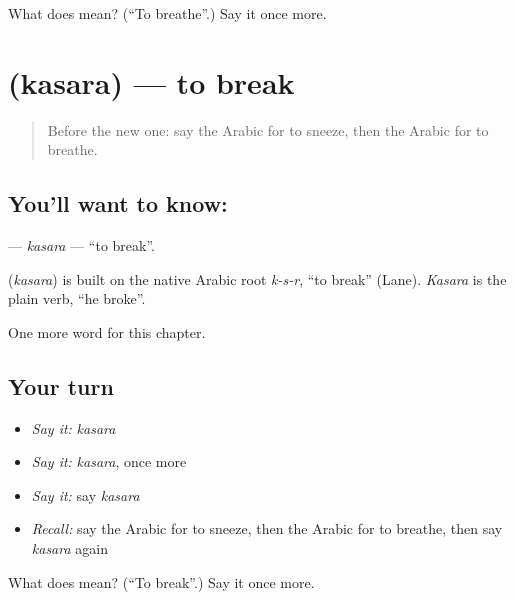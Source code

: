 \begin{tcolorbox}[breakable,colback=teal!4,colframe=teal!35!black,title={Before you move on}]
What does  mean? (\textquotedblleft{}To breathe\textquotedblright{}.) Say it once more.
\end{tcolorbox}
\section[\texorpdfstring{\ar{كسر} (kasara)}{كسر (kasara)}]{ (kasara) — to break}

\label{lesson:AR-C161-kasara}



\begin{quote}
Before the new one: say the Arabic for to sneeze, then the Arabic for to breathe.
\end{quote}

\subsection*{You'll want to know: }
\textbf{} — \emph{kasara} — \textquotedblleft{}to break\textquotedblright{}.

\begin{cousinweb}
\textbf{} (\emph{kasara}) is built on the native Arabic root \emph{k-s-r}, \textquotedblleft{}to break\textquotedblright{} (Lane). \emph{Kasara} is the plain verb, \textquotedblleft{}he broke\textquotedblright{}.
\end{cousinweb}

\begin{grammarlens}[title={What you've built}]
One more word for this chapter.
\end{grammarlens}

\subsection*{Your turn}
\begin{itemize}
\raggedright
  \item \emph{Say it:} \emph{kasara}
  \item \emph{Say it:} \emph{kasara}, once more
  \item \emph{Say it:} say \emph{kasara}
  \item \emph{Recall:} say the Arabic for to sneeze, then the Arabic for to breathe, then say \emph{kasara} again
\end{itemize}

\begin{tcolorbox}[breakable,colback=teal!4,colframe=teal!35!black,title={Before you move on}]
What does  mean? (\textquotedblleft{}To break\textquotedblright{}.) Say it once more.
\end{tcolorbox}
